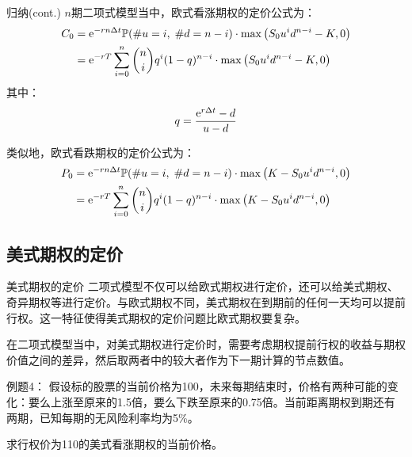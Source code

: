 \documentclass[t]{beamer}
\renewcommand{\Pr}{\mathbb{P}}
\begin{document}
\begin{frame}{归纳(cont.)}\small
$n$期二项式模型当中，欧式看涨期权的定价公式为：
\begin{equation*}
\begin{split}
C_0&= {\rm e}^{-rn\Delta t}\Pr(\#u=i,\;\#d=n-i)\cdot \max\left(S_0 u^id^{n-i}-K,0\right)\\
&={\rm e}^{-rT}\sum^n_{i=0}{n\choose i}q^i(1-q)^{n-i}\cdot \max\left(S_0 u^id^{n-i}-K,0\right)
\end{split}
\end{equation*} 
其中：
\[q=\frac{{\rm e}^{r\Delta t}-d}{u-d}\]

类似地，欧式看跌期权的定价公式为：
\begin{equation*}
\begin{split}
P_0&= {\rm e}^{-rn\Delta t}\Pr(\#u=i,\;\#d=n-i)\cdot \max\left(K-S_0 u^id^{n-i},0\right)\\
&={\rm e}^{-rT}\sum^n_{i=0}{n\choose i}q^i(1-q)^{n-i}\cdot \max\left(K-S_0 u^id^{n-i},0\right)
\end{split} 
\end{equation*}
\end{frame}

\subsection{美式期权的定价}
\begin{frame}{美式期权的定价}
	二项式模型不仅可以给欧式期权进行定价，还可以给美式期权、奇异期权等进行定价。与欧式期权不同，美式期权在到期前的任何一天均可以提前行权。这一特征使得美式期权的定价问题比欧式期权要复杂。

在二项式模型当中，对美式期权进行定价时，需要考虑期权提前行权的收益与期权价值之间的差异，然后取两者中的较大者作为下一期计算的节点数值。
\end{frame}

\begin{frame}{例题4：}
	假设标的股票的当前价格为100，未来每期结束时，价格有两种可能的变化：要么上涨至原来的1.5倍，要么下跌至原来的0.75倍。当前距离期权到期还有两期，已知每期的无风险利率均为5\%。

求行权价为110的美式看涨期权的当前价格。
\end{frame}
\end{document}
